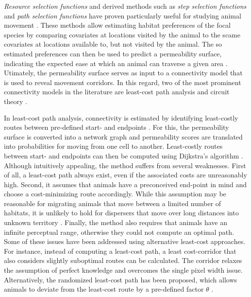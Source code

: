 \documentclass[abstract=on,10pt,a4paper,bibliography=totocnumbered]{article}
\begin{document}
\textit{Resource selection functions} \citep{Boyce.2002} and derived methods
such as \textit{step selection functions} \citep{Fortin.2005} and \textit{path
selection functions} \citep{Cushman.2010} have proven particularly useful for
studying animal movement \citep{Fieberg.2020}. These methods allow estimating
habitat preferences of the focal species by comparing covariates at locations
visited by the animal to the scame covariates at locations available to, but not
visited by the animal. The so estimated preferences can then be used to predict
a permeability surface, indicating the expected ease at which an animal can
traverse a given area \citep{Zeller.2012}. Utimately, the permeability surface
serves as input to a connectivity model that is used to reveal movement
corridors. In this regard, two of the most prominent connectivity models in the
literature are least-cost path analysis \citep{Adriaensen.2003} and circuit
theory \citep{McRae.2006, McRae.2008}.

In least-cost path analysis, connectivity is estimated by identifying
least-costly routes between pre-defined start- and endpoints
\citep{Adriaensen.2003}. For this, the permeability surface is converted into a
network graph and permeability scores are translated into probabilities for
moving from one cell to another. Least-costly routes between start- and
endpoints can then be computed using Dijkstra’s algorithm \citep{Dijkstra.1959}.
Although intuitively appealing, the method suffers from several weaknesses.
First of all, a least-cost path always exist, even if the associated costs are
unreasonably high. Second, it assumes that animals have a preconceived end-point
in mind and choose a cost-minimizing route accordingly. While this assumption
may be reasonable for migrating animals that move between a limited number of
habitats, it is unlikely to hold for dispersers that move over long distances
into unknown territory \citep{Koen.2014, Abrahms.2017, Cozzi.2020}. Finally, the
method also requires that animals have an infinite perceptual range, otherwise
they could not compute an optimal path. Some of these issues have been addressed
using alternative least-cost approaches. For instance, instead of computing a
least-cost path, a least cost-corridor that also considers slightly suboptimal
routes \citep{Pinto.2009} can be calculated. The corridor relaxes the assumption
of perfect knowledge and overcomes the single pixel width issue. Alternatively,
the randomized least-cost path has been proposed, which allows animals to
deviate from the least-cost route by a pre-defined factor \(\theta\)
\citep{Panzacchi.2016, VanMoorter.2021}.
\end{document}
